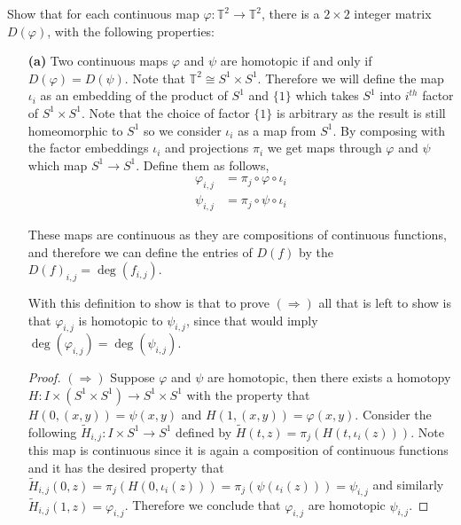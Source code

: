 \documentclass{homework651}
\begin{document}
\begin{problems}
\problem Show that for each continuous map $\varphi: \mathbb{T}^2 \to \mathbb{T}^2$, there is a $2 \times 2$ integer 
matrix $D(\varphi)$, with the following properties:
\begin{enumerate}
    \item[\textbf{(a)}] Two continuous maps $\varphi$ and $\psi$ are homotopic if and only if $D(\varphi) = D(\psi)$. 
    \solution
        Note that $\mathbb{T}^2 \cong S^1 \times S^1$. Therefore we will define the map $\iota_i$ as an embedding of the product of $S^1$ and 
        $\{1\}$ which takes $S^1$ into $i^{th}$ factor of $S^1 \times S^1$. Note that the choice of factor $\{1\}$ is arbitrary as the result 
        is still homeomorphic to $S^1$ so we consider $\iota_i$ as a map from $S^1$. By composing 
        with the factor embeddings $\iota_i$ and projections $\pi_i$ we get maps through $\varphi$ and $\psi$ which map $S^1 \to S^1$. 
        Define them as follows, 
        \begin{align*}
            \varphi_{i, j} &= \pi_j\circ\varphi\circ\iota_i\\ 
            \psi_{i, j} &=  \pi_j\circ\psi\circ\iota_i
        \end{align*}

        These maps are continuous as they are compositions of continuous functions, and therefore
        we can define the entries of $D(f)$ by the $D(f)_{i, j} = \deg(f_{i, j})$. 
        
        With this definition to show is that to prove $(\Rightarrow)$ all that is left to show is that $\varphi_{i, j}$ is 
        homotopic to $\psi_{i, j}$, since that would imply $\deg(\varphi_{i, j}) = \deg(\psi_{i, j})$. 

        \begin{proof}
        $(\Rightarrow)$ Suppose $\varphi$ and $\psi$ are homotopic, then there exists a homotopy $H: I \times (S^1 \times S^1)  \to S^1 \times S^1$ with the property
        that $H(0, (x, y)) = \psi(x, y)$ and $H(1, (x, y)) = \varphi(x, y)$. Consider the following $\tilde{H}_{i, j}: I \times S^1 \to S^1$
        defined by $\tilde{H}(t, z) = \pi_j(H(t, \iota_i(z)))$. Note this map is continuous since it is again a composition of continuous functions
        and it has the desired property that $\tilde{H}_{i, j}(0, z) = \pi_j(H(0, \iota_i(z))) = \pi_j(\psi(\iota_i(z))) = \psi_{i, j}$ and similarly $\tilde{H}_{i, j}(1, z) = \varphi_{i, j}$.
        Therefore we conclude that $\varphi_{i, j}$ are homotopic $\psi_{i, j}$. 
    \end{proof}



\end{enumerate}
\end{problems}
\end{document}
